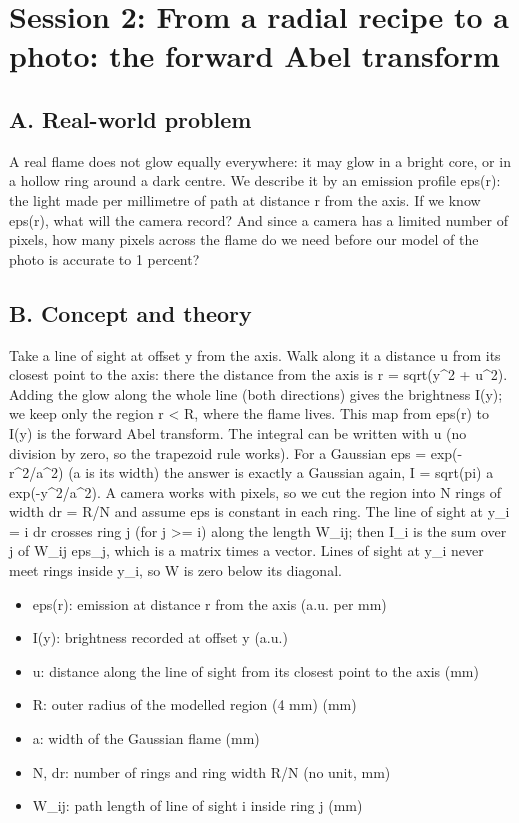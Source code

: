 \documentclass[11pt,a4paper]{article}
\begin{document}
\section{Session 2: From a radial recipe to a photo: the forward Abel transform}

\subsection*{A. Real-world problem}
A real flame does not glow equally everywhere: it may glow in a bright core, or in a hollow ring around a dark centre. We describe it by an emission profile eps(r): the light made per millimetre of path at distance r from the axis. If we know eps(r), what will the camera record? And since a camera has a limited number of pixels, how many pixels across the flame do we need before our model of the photo is accurate to 1 percent?

\subsection*{B. Concept and theory}
Take a line of sight at offset y from the axis. Walk along it a distance u from its closest point to the axis: there the distance from the axis is r = sqrt(y\textasciicircum{}2 + u\textasciicircum{}2). Adding the glow along the whole line (both directions) gives the brightness I(y); we keep only the region r \textless{} R, where the flame lives. This map from eps(r) to I(y) is the forward Abel transform. The integral can be written with u (no division by zero, so the trapezoid rule works). For a Gaussian eps = exp(-r\textasciicircum{}2/a\textasciicircum{}2) (a is its width) the answer is exactly a Gaussian again, I = sqrt(pi) a exp(-y\textasciicircum{}2/a\textasciicircum{}2). A camera works with pixels, so we cut the region into N rings of width dr = R/N and assume eps is constant in each ring. The line of sight at y\_i = i dr crosses ring j (for j \textgreater{}= i) along the length W\_ij; then I\_i is the sum over j of W\_ij eps\_j, which is a matrix times a vector. Lines of sight at y\_i never meet rings inside y\_i, so W is zero below its diagonal.

\begin{itemize}[nosep]
\item eps(r): emission at distance r from the axis (a.u. per mm)
\item I(y): brightness recorded at offset y (a.u.)
\item u: distance along the line of sight from its closest point to the axis (mm)
\item R: outer radius of the modelled region (4 mm) (mm)
\item a: width of the Gaussian flame (mm)
\item N, dr: number of rings and ring width R/N (no unit, mm)
\item W\_ij: path length of line of sight i inside ring j (mm)
\end{itemize}
\end{document}

